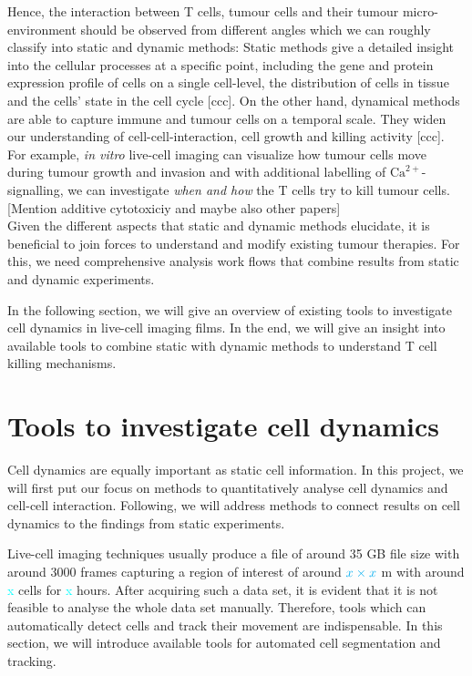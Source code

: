 \documentclass{report}
\begin{document}
Hence, the interaction between T cells, tumour cells and their tumour micro-environment should be observed from different angles which we can roughly classify into static and dynamic methods: Static methods give a detailed insight into the cellular processes at a specific point, including the gene and protein expression profile of cells on a single cell-level, the distribution of cells in tissue and the cells' state in the cell cycle [ccc]. 
On the other hand, dynamical methods are able to capture immune and tumour cells on a temporal scale. They widen our understanding of cell-cell-interaction, cell growth and killing activity [ccc]. For example, \textit{in vitro} live-cell imaging can visualize how tumour cells move during tumour growth and invasion and with additional labelling of $\text{Ca}^{2+}$-signalling, we can investigate \textit{when and how} the T cells try to kill tumour cells. [Mention additive cytotoxiciy and maybe also other papers] \\


Given the different aspects that static and dynamic methods elucidate, it is beneficial to join forces to understand and modify existing tumour therapies. For this, we need comprehensive analysis work flows that combine results from static and dynamic experiments.

In the following section, we will give an overview of existing tools to investigate cell dynamics in live-cell imaging films. In the end, we will give an insight into available tools to combine static with dynamic methods to understand T cell killing mechanisms.

\section{Tools to investigate cell dynamics}

Cell dynamics are equally important as static cell information. In this project, we will first put our focus on methods to quantitatively analyse cell dynamics and cell-cell interaction. Following, we will address methods to connect results on cell dynamics to the findings from static experiments.

Live-cell imaging techniques usually produce a file of around 35 GB file size with around 3000 frames capturing a region of interest of around $\color{cyan}{x} \times \color{cyan}{x}$ \textmu m with around \textcolor{cyan}{x} cells for \textcolor{cyan}{x} hours. After acquiring such a data set, it is evident that it is not feasible to analyse the whole data set manually. Therefore, tools which can automatically detect cells and track their movement are indispensable. In this section, we will introduce available tools for automated cell segmentation and tracking.
\end{document}
